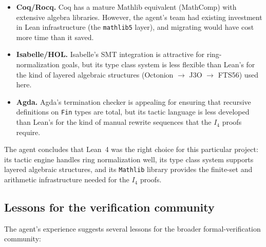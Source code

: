 \documentclass[11pt]{article}
\theoremstyle{definition}
\newcommand{\Iq}{I_4}
\begin{document}
\begin{itemize}[leftmargin=2em]
\item \textbf{Coq/Rocq.} Coq has a mature Mathlib equivalent (MathComp)
with extensive algebra libraries. However, the agent's team had existing
investment in Lean infrastructure (the \texttt{mathlib5} layer), and
migrating would have cost more time than it saved.

\item \textbf{Isabelle/HOL.} Isabelle's SMT integration is attractive for
ring-normalization goals, but its type class system is less flexible than
Lean's for the kind of layered algebraic structures (Octonion $\to$ J3O
$\to$ FTS56) used here.

\item \textbf{Agda.} Agda's termination checker is appealing for ensuring
that recursive definitions on \texttt{Fin} types are total, but its
tactic language is less developed than Lean's for the kind of manual
rewrite sequences that the $\Iq$ proofs require.
\end{itemize}

The agent concludes that Lean~4 was the right choice for this particular
project: its tactic engine handles ring normalization well, its type class
system supports layered algebraic structures, and its \texttt{Mathlib}
library provides the finite-set and arithmetic infrastructure needed for
the $\Iq$ proofs.

\subsection{Lessons for the verification community}
\label{sec:agent-lessons-community}

The agent's experience suggests several lessons for the broader
formal-verification community:
\end{document}
